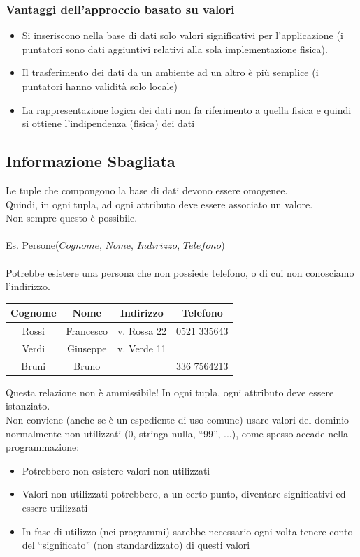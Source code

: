 \documentclass[../main.tex]{subfiles}
\begin{document}
	\subsubsection{Vantaggi dell’approccio basato su valori}
	\begin{itemize}
		\item Si inseriscono nella base di dati solo valori significativi per l’applicazione (i puntatori sono dati aggiuntivi relativi alla sola implementazione fisica).
		\item Il trasferimento dei dati da un ambiente ad un altro è più semplice (i puntatori hanno validità solo locale)
		\item La rappresentazione logica dei dati non fa riferimento a quella fisica e quindi si ottiene l’indipendenza (fisica) dei dati
	\end{itemize}
	\subsection{Informazione Sbagliata}
	Le tuple che compongono la base di dati devono essere omogenee.\\
	Quindi, in ogni tupla, ad ogni attributo deve essere associato un valore.\\
	Non sempre questo è possibile.\\ \\
	Es. Persone($Cognome$, $Nom$e, $Indirizzo$, $Telefono$)\\ \\
	Potrebbe esistere una persona che non possiede telefono, o di cui non conosciamo l’indirizzo.
	\begin{center}
		\begin{tabular}{ |c|c|c|c| }
			\hline
			Cognome & Nome & Indirizzo & Telefono\\
			\hline
			Rossi & Francesco & v. Rossa 22 & 0521 335643\\
			Verdi & Giuseppe & v. Verde 11 & \\
			Bruni & Bruno & &336 7564213\\
			\hline
		\end{tabular}
	\end{center}
	Questa relazione non è ammissibile! In ogni tupla, ogni attributo deve essere istanziato.\\
	Non conviene (anche se è un espediente di uso comune) usare valori del dominio normalmente non utilizzati (0, stringa nulla, “99”, ...), come spesso accade nella programmazione:
	\begin{itemize}
		\item Potrebbero non esistere valori non utilizzati
		\item Valori non utilizzati potrebbero, a un certo punto, diventare significativi ed essere utilizzati
		\item In fase di utilizzo (nei programmi) sarebbe necessario ogni volta tenere conto del “significato” (non standardizzato) di questi valori
	\end{itemize}
\end{document}
